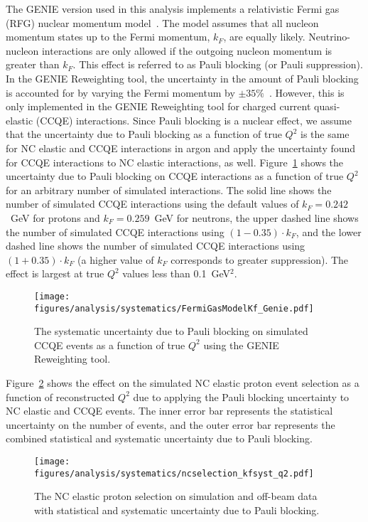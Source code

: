     The GENIE version used in this analysis implements a relativistic Fermi gas
    (RFG) nuclear momentum model~\cite{Bodek:1981wr}. The model assumes that
    all nucleon momentum states up to the Fermi momentum, $k_F$, are equally
    likely.  Neutrino-nucleon interactions are only allowed if the outgoing
    nucleon momentum is greater than $k_F$. This effect is referred to as Pauli
    blocking (or Pauli suppression). In the GENIE Reweighting tool, the
    uncertainty in the amount of Pauli blocking is accounted for by varying the
    Fermi momentum by $\pm 35\%$~\cite{Andreopoulos:2015wxa}. However, this is
    only implemented in the GENIE Reweighting tool for charged current
    quasi-elastic (CCQE) interactions. Since Pauli blocking is a nuclear
    effect, we assume that the uncertainty due to Pauli blocking as a function of
    true $Q^2$ is the same for NC elastic and CCQE interactions in argon and
    apply the uncertainty found for CCQE interactions to NC elastic
    interactions, as well.  Figure~\ref{fig:pauliblock} shows the uncertainty
    due to Pauli blocking on CCQE interactions as a function of true $Q^2$ for
    an arbitrary number of simulated interactions. The solid line shows the
    number of simulated CCQE interactions using the default values of $k_F =
    0.242$~GeV for protons and $k_F = 0.259$~GeV for neutrons, the upper dashed
    line shows the number of simulated CCQE interactions using $(1 - 0.35)\cdot k_F$,
    and the lower dashed line shows the number of simulated CCQE interactions
    using $(1 + 0.35)\cdot k_F$ (a higher value of $k_F$ corresponds to greater
    suppression). The effect is largest at true $Q^2$ values less than
    0.1~GeV$^2$.
    \begin{figure}[ht]
      \centering
      \texttt{[image: figures/analysis/systematics/FermiGasModelKf\_Genie.pdf]}
      \caption{The systematic uncertainty due to Pauli blocking on simulated
      CCQE events as a function of true $Q^2$ using the GENIE Reweighting
      tool.}
      \label{fig:pauliblock}
    \end{figure}

    Figure~\ref{fig:systpauli} shows the effect on the simulated NC elastic
    proton event selection as a function of reconstructed $Q^2$ due to applying
    the Pauli blocking uncertainty to NC elastic and CCQE events. The inner
    error bar represents the statistical uncertainty on the number of events,
    and the outer error bar represents the combined statistical and  systematic
    uncertainty due to Pauli blocking.
    \begin{figure}[ht]
      \centering
      \texttt{[image: figures/analysis/systematics/ncselection\_kfsyst\_q2.pdf]}
      \caption{The NC elastic proton selection on simulation and off-beam data
      with statistical and systematic uncertainty due to Pauli blocking.}
      \label{fig:systpauli}
    \end{figure}

